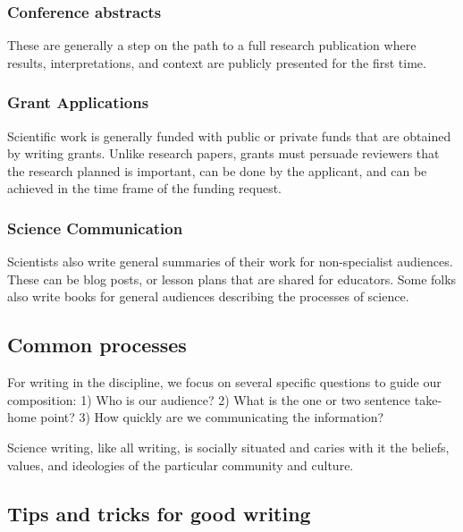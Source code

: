 \documentclass[11pt,]{article}
\begin{document}
\hypertarget{conference-abstracts}{%
\subsubsection{Conference abstracts}\label{conference-abstracts}}

These are generally a step on the path to a full research publication
where results, interpretations, and context are publicly presented for
the first time.

\hypertarget{grant-applications}{%
\subsubsection{Grant Applications}\label{grant-applications}}

Scientific work is generally funded with public or private funds that
are obtained by writing grants. Unlike research papers, grants must
persuade reviewers that the research planned is important, can be done
by the applicant, and can be achieved in the time frame of the funding
request.

\hypertarget{science-communication}{%
\subsubsection{Science Communication}\label{science-communication}}

Scientists also write general summaries of their work for non-specialist
audiences. These can be blog posts, or lesson plans that are shared for
educators. Some folks also write books for general audiences describing
the processes of science.

\hypertarget{common-processes}{%
\subsection{Common processes}\label{common-processes}}

For writing in the discipline, we focus on several specific questions to
guide our composition: 1) Who is our audience? 2) What is the one or two
sentence take-home point? 3) How quickly are we communicating the
information?

Science writing, like all writing, is socially situated and caries with
it the beliefs, values, and ideologies of the particular community and
culture.

\hypertarget{tips-and-tricks-for-good-writing}{%
\subsection{Tips and tricks for good
writing}\label{tips-and-tricks-for-good-writing}}
\end{document}

